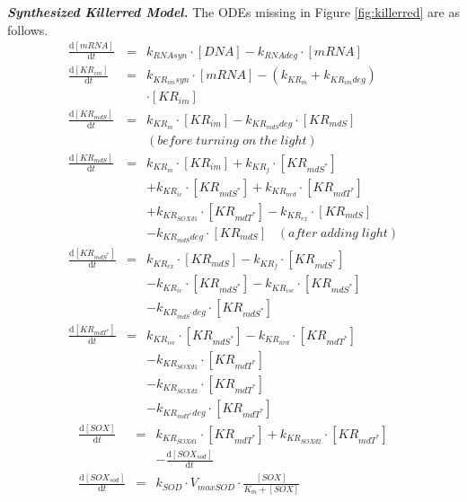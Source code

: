 \textbf{\textit{Synthesized Killerred Model.}} The ODEs missing in Figure \ref{fig:killerred} are as follows.
\begin{eqnarray*}
\frac{\mathrm{d}[mRNA]}{\mathrm{d}t} & =& k_{RNAsyn} \cdot [DNA] - k_{RNAdeg} \cdot [mRNA]\\
\frac{\mathrm{d}[KR_{im}]}{\mathrm{d}t} & =& k_{KR_{im}syn} \cdot [mRNA] - (k_{KR_m} + k_{KR_{im}deg})\\
& & \cdot [KR_{im}]\\
\frac{\mathrm{d}[KR_{mdS}]}{\mathrm{d}t} &=& k_{KR_{m}} \cdot [KR_{im}] - k_{KR_{mdS}deg} \cdot [KR_{mdS}]\\
& &(before\; turning \; on \; the \; light)\\
\frac{\mathrm{d}[KR_{mdS}]}{\mathrm{d}t} &=& k_{KR_{m}} \cdot [KR_{im}] + k_{KR_f} \cdot [KR_{mdS^*}] \\
& &+ k_{KR_{ic}} \cdot [KR_{mdS^*}] + k_{KR_{nrd}} \cdot [KR_{mdT^*}]\\
& &+ k_{KR_{SOXd1}} \cdot [KR_{mdT^* }] - k_{KR_{ex}} \cdot [KR_{mdS}]\\
& &- k_{KR_{mdS}deg} \cdot [KR_{mdS}]\;\;\; (after\; adding\; light)\\
\frac{\mathrm{d}[KR_{mdS^*}]}{\mathrm{d}t} &=& k_{KR_{ex}} \cdot [KR_{mdS}] - k_{KR_f } \cdot [KR_{mdS^*}] \\
& &-k_{KR_{ic}} \cdot [KR_{mdS^*}] - k_{KR_{isc}} \cdot [KR_{mdS^*}]\\
& &- k_{KR_{mdS^*}deg} \cdot [KR_{mdS^*}]\\
\frac{\mathrm{d}[KR_{mdT^*}]}{\mathrm{d}t} &=& k_{KR_{isc}} \cdot [KR_{mdS^*}] - k_{KR_{nrd}} \cdot [KR_{mdT^*}]\\
& &- k_{KR_{SOXd1}} \cdot [KR_{mdT^*}]\\
& &- k_{KR_{SOXd2}} \cdot [KR_{mdT^*}]\\
& &- k_{KR_{mdT^*}deg} \cdot [KR_{mdT^*}]
\end{eqnarray*}
\begin{eqnarray*}
\frac{\mathrm{d}[SOX]}{\mathrm{d}t} &=& k_{KR_{SOXd1}} \cdot [KR_{mdT^*}] + k_{KR_{SOXd2}} \cdot [KR_{mdT^*}]\\
& &- \frac{\mathrm{d}[SOX_{sod}]}{\mathrm{d}t}\\
\frac{\mathrm{d}[SOX_{sod}]}{\mathrm{d}t} &=& k_{SOD} \cdot V_{maxSOD} \cdot \frac{[SOX]}{K_m + [SOX]}
\end{eqnarray*}












